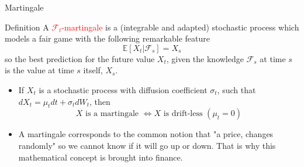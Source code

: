 \documentclass{beamer}
\begin{document}
\begin{frame}{Martingale}
	\begin{block}{Definition}
		A \textcolor{red}{$\mathcal{F}_t$-martingale} is a (integrable and adapted) stochastic process which models a fair game with the following remarkable feature
		\begin{equation}
			\mathbb{E}[X_t|\mathcal{F}_s] = X_s
		\end{equation}
		so the best prediction for the future value $X_t$, given the knowledge $\mathcal{F}_s$ at time $s$ is the value at time $s$ itself, $X_s$.
	\end{block}
	\begin{itemize}
	\item If $X_t$ is a stochastic process with diffusion coefficient $\sigma_t$, such that %
	$dX_t=\mu_t dt+\sigma_t dW_t$, then 
	\begin{equation*}
		X\text{ is a martingale } \iff X\text{ is drift-less } (\mu_t=0)
	\end{equation*}
	\item A martingale corresponds to the common notion that "a price, changes randomly" so we cannot know if it will go up or down. That is why this mathematical concept is brought into finance.
\end{itemize}	
\end{frame}
\end{document}
